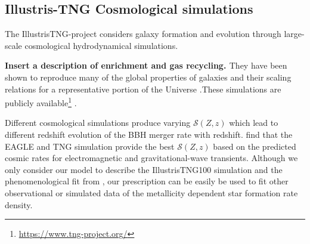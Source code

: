 \documentclass[twocolumn]{aastex631}
\newcommand{\SFRDzZ}{\ensuremath{\mathcal{S}(Z,z)}\xspace}
\newcommand{\SdM}[1]{{\color{pink}\bf{#1}}}
\begin{document}


\subsection{Illustris-TNG Cosmological simulations}

The IllustrisTNG-project considers galaxy formation and evolution through large-scale cosmological hydrodynamical simulations.


\SdM{Insert a description of enrichment and gas recycling. }
They have been shown to reproduce many of the global properties of galaxies and their scaling relations for a representative portion of the Universe \citep[e.g.][]{FirstResTNG_Naiman2018,Torrey+2021,Genel+2018,Hemler+2021}.These simulations are publicly available\footnote{ \url{https://www.tng-project.org/}} \citep{FirstResTNG_Springel2018,FirstResTNG_Marinacci2018, FirstResTNG_Nelson2018,FirstResTNG_Pillepich2018, FirstResTNG_Naiman2018}.

Different cosmological simulations produce varying \SFRDzZ which lead to different redshift evolution of the BBH merger rate with redshift. \cite{Briel+2021} find that the EAGLE and TNG simulation provide the best \SFRDzZ based on the predicted cosmic rates for electromagnetic and gravitational-wave transients. 
Although we only consider our model to describe the IllustrisTNG100 simulation and the phenomenological fit from \cite{Neijssel+2019}, our prescription can be easily be used to fit other observational or simulated data of the metallicity dependent star formation rate density.
\end{document}
